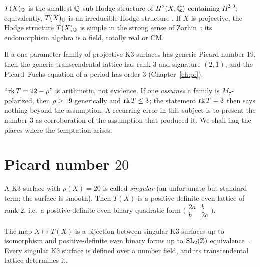 \begin{theorem}\label{thm:Tminimal}
$T(X)_{\mathbb{Q}}$ is the smallest $\mathbb{Q}$-sub-Hodge structure of $H^2(X,\mathbb{Q})$ containing
$H^{2,0}$; equivalently, $T(X)_{\mathbb{Q}}$ is an irreducible Hodge structure
\cite[Lem.~3.3.1]{Huybrechts2016}. If $X$ is projective, the Hodge structure
$T(X)_{\mathbb{Q}}$ is simple in the strong sense of Zarhin~\cite[Thm.~1.6]{Zarhin1983}:
its endomorphism algebra is a field, totally real or CM.
\end{theorem}

\begin{corollary}\label{cor:rho19}
If a one-parameter family of projective K3 surfaces has generic Picard number
$19$, then the generic transcendental lattice has rank $3$ and signature
$(2,1)$, and the Picard--Fuchs equation of a period has order $3$
(Chapter~\ref{ch:pf}).
\end{corollary}

\begin{warning}\label{warn:rho-from-arithmetic}
``$\operatorname{rk} T=22-\rho$'' is arithmetic, not evidence. If one \emph{assumes} a
family is $M_7$-polarized, then $\rho\ge19$ generically and $\operatorname{rk} T\le3$; the
statement $\operatorname{rk} T=3$ then says nothing beyond the assumption. A recurring
error in this subject is to present the number $3$ as corroboration of the
assumption that produced it. We shall flag the places where the temptation
arises.
\end{warning}

\section{Picard number $20$}

\begin{definition}
A K3 surface with $\rho(X)=20$ is called \emph{singular} (an unfortunate but
standard term; the surface is smooth). Then $T(X)$ is a positive-definite
even lattice of rank $2$, i.e.\ a positive-definite even binary quadratic
form $\bigl(\begin{smallmatrix}2a&b\\b&2c\end{smallmatrix}\bigr)$.
\end{definition}

\begin{theorem}\label{thm:shioda-inose}
The map $X\mapsto T(X)$ is a bijection between singular K3 surfaces up to
isomorphism and positive-definite even binary forms up to $\operatorname{SL}_2(\mathbb{Z})$
equivalence~\cite{ShiodaInose1977}. Every singular K3 surface is defined over
a number field, and its transcendental lattice determines it.
\end{theorem}

